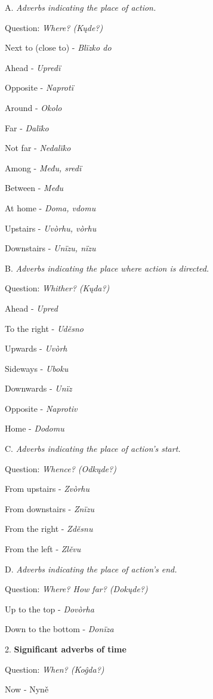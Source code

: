 A. \textit{Adverbs indicating the place of action.}

Question: \textit{Where? (Kųde?)}

Next to (close to) - \textit{Blïzko do}

Ahead - \textit{Upredï}

Opposite - \textit{Naprotï}

Around - \textit{Okolo}

Far - \textit{Dalïko}

Not far - \textit{Nedalïko}

Among - \textit{Među, sredï}

Between - \textit{Među}

At home -\textit{ Doma, vdomu}

Upstairs - \textit{Uvòrhu, vòrhu}

Downstairs - \textit{Unïzu, nïzu}

B. \textit{Adverbs indicating the place where action is directed. }

Question:\textit{ Whither? (Kųda?)}

Ahead - \textit{Upred}

To the right - \textit{Uděsno}

Upwards - \textit{Uvòrh}

Sideways - \textit{Uboku}

Downwards - \textit{Unïz}

Opposite - \textit{Naprotiv}

Home - \textit{Dodomu}

C. \textit{Adverbs indicating the place of action’s start.}

Question: \textit{Whence? (Odkųde?)}

From upstairs - \textit{Zvòrhu}

From downstairs - \textit{Znïzu}

From the right - \textit{Zděsnu}

From the left - \textit{Zlěvu}

D. \textit{Adverbs indicating the place of action’s end.}

Question: \textit{Where? How far? (Dokųde?)}

Up to the top - \textit{Dovòrha}

Down to the bottom - \textit{Donïza}

2. \textbf{Significant adverbs of time}

Question: \textit{When? (Koĝda?)}

Now - Nyně

